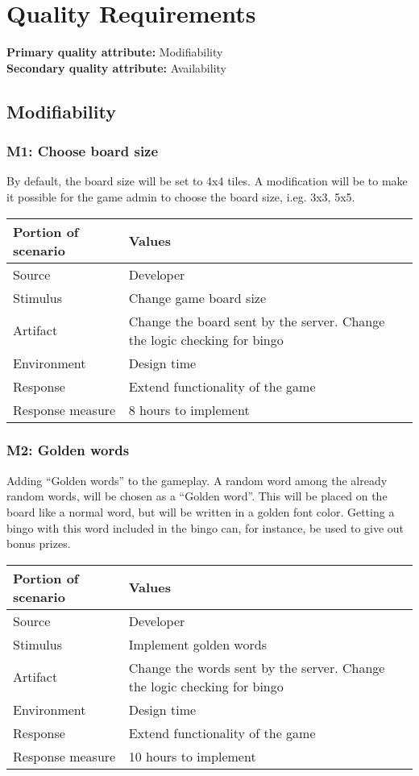 \section{Quality Requirements}

{\bf Primary quality attribute: } Modifiability\\
{\bf Secondary quality attribute: } Availability

\subsection{Modifiability}

\subsubsection*{M1: Choose board size}
By default, the board size will be set to 4x4 tiles. 
A modification will be to make it possible for the game admin to choose the
board size, i.eg. 3x3, 5x5.

\begin{tabular}{|m{}|m{}|}
\hline
{\bf Portion of scenario} & {\bf Values} \\ \hline
Source & Developer \\ \hline
Stimulus & Change game board size \\ \hline
Artifact & Change the board sent by the server. Change the logic
checking for bingo \\ \hline
Environment & Design time \\ \hline
Response & Extend functionality of the game \\ \hline
Response measure & 8 hours to implement \\ \hline
\end{tabular}
\newline

\subsubsection*{M2: Golden words}
Adding ``Golden words'' to the gameplay. A random word among the already random
words, will be chosen as a ``Golden word''. This will be placed on the board
like a normal word, but will be written in a golden font color. Getting a bingo
with this word included in the bingo can, for instance, be used to give out
bonus prizes.

\begin{tabular}{|m{}|m{}|}
\hline
{\bf Portion of scenario} & {\bf Values} \\ \hline
Source & Developer \\ \hline
Stimulus & Implement golden words \\ \hline
Artifact & Change the words sent by the server. Change the logic
checking for bingo \\ \hline
Environment & Design time \\ \hline
Response & Extend functionality of the game \\ \hline
Response measure & 10 hours to implement \\ \hline
\end{tabular}

